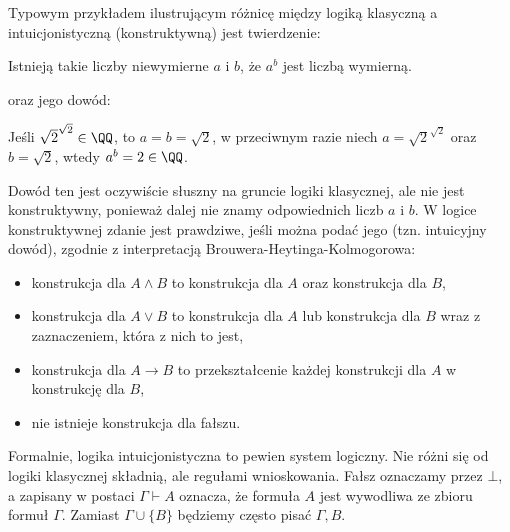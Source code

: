 \documentclass[polish,pretty,bibliography=totocnumbered]{angav}
\begin{document}
Typowym przykładem ilustrującym różnicę między logiką klasyczną a intuicjonistyczną (konstruktywną) jest twierdzenie:
\begin{displayquote}
    Istnieją takie liczby niewymierne $a$ i $b$, że $a^b$ jest liczbą wymierną.
\end{displayquote}
oraz jego dowód:
\begin{displayquote}
    Jeśli $\sqrt{2}^{\sqrt{2}} \in \QQ$, to $a = b = \sqrt{2}$, w przeciwnym razie niech $a = \sqrt{2}^{\sqrt{2}}$ oraz $b = \sqrt{2}$, wtedy $a^b = 2 \in \QQ$.
\end{displayquote}
Dowód ten jest oczywiście słuszny na gruncie logiki klasycznej, ale nie jest konstruktywny, ponieważ dalej nie znamy odpowiednich liczb $a$ i $b$. W logice konstruktywnej zdanie jest prawdziwe, jeśli można podać jego  (tzn. intuicyjny dowód), zgodnie z interpretacją Brouwera-Heytinga-Kolmogorowa:
\begin{itemize}[noitemsep]
    \item konstrukcja dla $A \land B$ to konstrukcja dla $A$ oraz konstrukcja dla $B$,
    \item konstrukcja dla $A \lor B$ to konstrukcja dla $A$ lub konstrukcja dla $B$ wraz z zaznaczeniem, która z nich to jest,
    \item konstrukcja dla $A \to B$ to przekształcenie każdej konstrukcji dla $A$ w konstrukcję dla $B$,
    \item nie istnieje konstrukcja dla fałszu.
\end{itemize}

Formalnie, logika intuicjonistyczna to pewien system logiczny. Nie różni się od logiki klasycznej składnią, ale regułami wnioskowania.
Fałsz oznaczamy przez $\bot$, a  zapisany w postaci $\Gamma \vdash A$ oznacza, że formuła $A$ jest wywodliwa ze zbioru formuł $\Gamma$.
Zamiast $\Gamma \cup \{B\}$ będziemy często pisać $\Gamma, B$.
\end{document}
